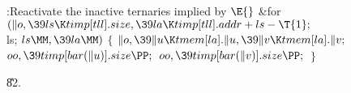 \B{}:Reactivate the inactive ternaries implied by \X${}\E{}$\6
\&{for} ${}(\|o,\39\\{ls}\K\\{timp}[\\{tll}].\\{size},\39\\{la}\K\\{timp}[%
\\{tll}].\\{addr}+\\{ls}-\T{1};{}$ \\{ls}; ${}\\{ls}\MM,\39\\{la}\MM){}$\5
${}\{{}$\1\6
${}\|o,\39\|u\K\\{tmem}[\\{la}].\|u,\39\|v\K\\{tmem}[\\{la}].\|v;{}$\6
${}\\{oo},\39\\{timp}[\\{bar}(\|u)].\\{size}\PP;{}$\6
${}\\{oo},\39\\{timp}[\\{bar}(\|v)].\\{size}\PP;{}$\6
\4${}\}{}$\2\par
\U82.\fi

